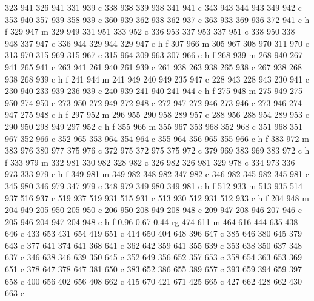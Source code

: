 {{        323 941 326 941 331 939 c
        338 938 339 938 341 941 c
        343 943 344 943 349 942 c
        353 940 357 939 358 939 c
        360 939 362 938 362 937 c
        363 933 369 936 372 941 c
        h f
        329 947 m
        329 949 331 951 333 952 c
        336 953 337 953 337 951 c
        338 950 338 948 337 947 c
        336 944 329 944 329 947 c
        h f
        307 966 m
        305 967 308 970 311 970 c
        313 970 315 969 315 967 c
        315 964 309 963 307 966 c
        h f
        268 939 m
        268 940 267 941 265 941 c
        263 941 261 940 261 939 c
        261 938 263 938 265 938 c
        267 938 268 938 268 939 c
        h f
        241 944 m
        241 949 240 949 235 947 c
        228 943 228 943 230 941 c
        230 940 233 939 236 939 c
        240 939 241 940 241 944 c
        h f
        275 948 m
        275 949 275 950 274 950 c
        273 950 272 949 272 948 c
        272 947 272 946 273 946 c
        273 946 274 947 275 948 c
        h f
        297 952 m
        296 955 290 958 289 957 c
        288 956 288 954 289 953 c
        290 950 298 949 297 952 c
        h f
        355 966 m
        355 967 353 968 352 968 c
        351 968 351 967 352 966 c
        352 965 353 964 354 964 c
        355 964 356 965 355 966 c
        h f
        383 972 m
        383 976 380 977 375 976 c
        372 975 372 975 375 972 c
        379 969 383 969 383 972 c
        h f
        333 979 m
        332 981 330 982 328 982 c
        326 982 326 981 329 978 c
        334 973 336 973 333 979 c
        h f
        349 981 m
        349 982 348 982 347 982 c
        346 982 345 982 345 981 c
        345 980 346 979 347 979 c
        348 979 349 980 349 981 c
        h f
        512 933 m
        513 935 514 937 516 937 c
        519 937 519 931 515 931 c
        513 930 512 931 512 933 c
        h f
        204 948 m
        204 949 205 950 205 950 c
        206 950 208 949 208 948 c
        209 947 208 946 207 946 c
        205 946 204 947 204 948 c
        h f
        0.96 0.67 0.44 rg
        474 611 m
        464 616 444 635 438 646 c
        433 653 431 654 419 651 c
        414 650 404 648 396 647 c
        385 646 380 645 379 643 c
        377 641 374 641 368 641 c
        362 642 359 641 355 639 c
        353 638 350 637 348 637 c
        346 638 346 639 350 645 c
        352 649 356 652 357 653 c
        358 654 363 653 369 651 c
        378 647 378 647 381 650 c
        383 652 386 655 389 657 c
        393 659 394 659 397 658 c
        400 656 402 656 408 662 c
        415 670 421 671 425 665 c
        427 662 428 662 430 663 c
}}
